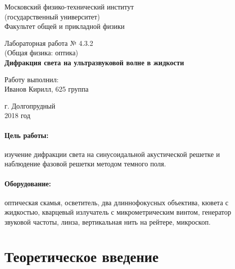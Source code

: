 \documentclass[12pt]{kiarticle} %
\begin{document}
	
	\begin{titlepage}
	\begin{center}
		\large 	Московский физико-технический институт \\
		(государственный университет) \\
		Факультет общей и прикладной физики \\
		\vspace{0.2cm}
		
		\vspace{4.5cm}
		Лабораторная работа № 4.3.2 \\ \vspace{0.2cm}
		\large (Общая физика: оптика) \\ \vspace{0.2cm}
		\LARGE \textbf{Дифракция света на ультразвуковой волне в жидкости}
	\end{center}
	\vspace{2.3cm} \large
	
	\begin{center}
		Работу выполнил: \\
		Иванов Кирилл,
		625 группа
		\vspace{10mm}		
		
	\end{center}
	
	\begin{center} \vspace{60mm}
		г. Долгопрудный \\
		2018 год
	\end{center}
\end{titlepage}
	
	\paragraph*{Цель работы:} изучение дифракции света на синусоидальной акустической решетке и
	наблюдение фазовой решетки методом темного поля.
	
	\paragraph*{Оборудование:} оптическая скамья, осветитель, два длиннофокусных объектива, кювета с жидкостью, кварцевый излучатель с микрометрическим винтом, генератор звуковой частоты, линза, вертикальная нить на рейтере, микроскоп.
	
	\section{Теоретическое введение}
	
\end{document}
